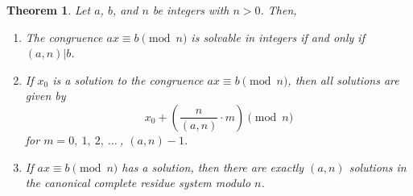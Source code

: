 \documentclass[12pt,leqno]{article}
\numberwithin{equation}{section}
\newtheorem{thm}{Theorem}[section]
\theoremstyle{definition}
\begin{document}
\begin{thm}
Let $a$, $b$, and $n$ be integers with $n > 0$. Then,
\begin{enumerate}
\item The congruence $ax \equiv b \pmod{n}$ is solvable in integers if
and only if $(a,n)|b$.
\item If $x_0$ is a solution to the congruence $ax \equiv b\pmod{n}$,
then all solutions are given by \[ x_0 + \left(\frac{n}{(a,n)}\cdot
m\right)\pmod{n}\] for $m = 0,\ 1,\ 2,\ \hdots\ $, $(a, n)-1$.
\item If $ax \equiv b \pmod{n}$ has a solution, then there are exactly
$(a, n)$ solutions in the canonical complete residue system modulo
$n$.
\end{enumerate}
\end{thm}
\end{document}
